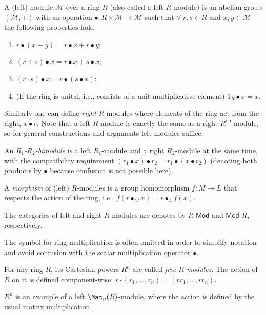 \begin{defn}
    A (left) module $\mathcal{M}$ over a ring $R$ (also called a left
    $R$-module) is an abelian group $(\mathcal{M},+)$ with an operation
    $\bullet:R\times\mathcal{M}\rightarrow\mathcal{M}$ such that $\forall~r,s\in R$
    and $x,y\in\mathcal{M}$ the following properties hold 
    \begin{enumerate}
    \item $r\bullet(x+y)=r\bullet x+r\bullet y$;
    \item $(r+s)\bullet x=r\bullet x+s\bullet x$;
    \item $(r\cdot s)\bullet x=r\bullet(s\bullet x)$;
    \item (If the ring is unital, i.e., consists of a unit multiplicative element)
    $1_{R}\bullet x=x$. 
    \end{enumerate}
    Similarly one can define \emph{right} $R$-modules where elements
    of the ring act from the right, $x\bullet r$. Note that a left $R$-module
    is exactly the same as a right $R^{\mathrm{op}}$-module, so for general constructions
    and arguments left modules suffice.

    An $R_{1}$\emph{-$R_{2}$-bimodule} is a left $R_{1}$-module and
    a right $R_{2}$-module at the same time, with the compatibility requirement
    $\left(r_{1}\bullet x\right)\bullet r_{2}=r_{1}\bullet\left(x\bullet r_{2}\right)$
    (denoting both products by $\bullet$ because confusion is not possible
    here).

    A \emph{morphism} of (left) $R$-modules is a group homomorphism
    $f:M\to L$ that respects the action of the ring, i.e., $f\left(r\bullet_{M}x\right)=r\bullet_{L}f\left(x\right)$.

    The categories of left and right $R$-modules are denotes by $R\text{-}\mathsf{Mod}$
    and $\mathsf{Mod}\text{-}R$, respectively.
\end{defn}
The symbol for ring multiplication is often omitted in order to simplify
notation and avoid confusion with the scalar multiplication operator
$\bullet$.
\begin{example}
    For any ring $R$, its Cartesian powers $R^{n}$ are called \emph{free
    $R$-modules}. The action of $R$ on it is defined component-wise:
    $r\cdot\left(r_{1},\ldots,r_{n}\right)=\left(rr_{1},\ldots,rr_{n}\right)$.
\end{example}
%
\begin{example}
    $R^{n}$ is an example of a left $\Mat_n(R)$-module,
    where the action is defined by the usual matrix multiplication.
\end{example}
